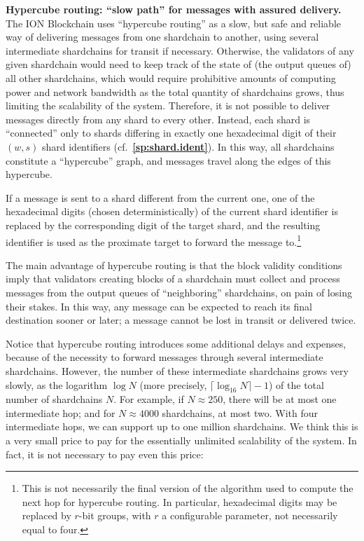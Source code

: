\documentclass[12pt,oneside]{article}
\def\makepoint#1{\medbreak\noindent{\bf #1.\ }}
\def\nxsubpoint{\refstepcounter{subsubsection}%
  \smallbreak\makepoint{\thesubsubsection}}
\def\refpoint#1{{\rm\textbf{\ref{#1}}}}
\let\ptref=\refpoint
\def\embt(#1.){\textbf{#1.}}
\begin{document}
\nxsubpoint\label{sp:hypercube} \embt(Hypercube routing: ``slow path''
for messages with assured delivery.)  The ION Blockchain uses
``hypercube routing'' as a slow, but safe and reliable way of
delivering messages from one shardchain to another, using several
intermediate shardchains for transit if necessary.  Otherwise,
the validators of any given shardchain would need to keep track of the
state of (the output queues of) all other shardchains, which would
require prohibitive amounts of computing power and network bandwidth
as the total quantity of shardchains grows, thus limiting the
scalability of the system.  Therefore, it is not possible to deliver
messages directly from any shard to every other. Instead, each shard
is ``connected'' only to shards differing in exactly one hexadecimal
digit of their $(w,s)$ shard identifiers
(cf.~\ptref{sp:shard.ident}). In this way, all shardchains constitute
a ``hypercube'' graph, and messages travel along the edges of this
hypercube.

If a message is sent to a shard different from the current one, one of
the hexadecimal digits (chosen deterministically) of the current shard
identifier is replaced by the corresponding digit of the target shard,
and the resulting identifier is used as the proximate target to
forward the message to.\footnote{This is not necessarily the final
  version of the algorithm used to compute the next hop for hypercube
  routing. In particular, hexadecimal digits may be replaced by
  $r$-bit groups, with $r$ a configurable parameter, not necessarily
  equal to four.}

The main advantage of hypercube routing is that the block validity
conditions imply that validators creating blocks of a shardchain must
collect and process messages from the output queues of ``neighboring''
shardchains, on pain of losing their stakes. In this way, any message
can be expected to reach its final destination sooner or later; a
message cannot be lost in transit or delivered twice.

Notice that hypercube routing introduces some additional delays and
expenses, because of the necessity to forward messages through several
intermediate shardchains. However, the number of these intermediate
shardchains grows very slowly, as the logarithm $\log N$ (more
precisely, $\lceil\log_{16}N\rceil-1$) of the total number of
shardchains $N$. For example, if $N\approx250$, there will be at most
one intermediate hop; and for $N\approx4000$ shardchains, at most
two. With four intermediate hops, we can support up to one million
shardchains. We think this is a very small price to pay for the
essentially unlimited scalability of the system. In fact, it is not
necessary to pay even this price:
\end{document}
